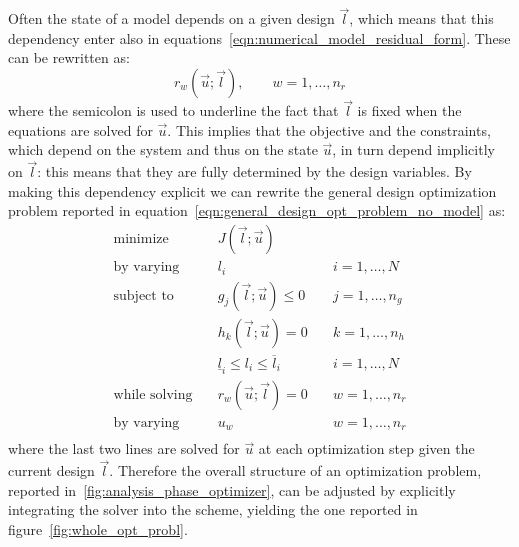 Often the state of a model depends on a given design $\vec{l}$, which means that this dependency enter also in equations~\eqref{eqn:numerical_model_residual_form}. These can be rewritten as:
\begin{equation}
	r_w(\vec{u};\vec{l}), \qquad w=1, \dots, n_r
\end{equation}
where the semicolon is used to underline the fact that $\vec{l}$ is fixed when the equations are solved for $\vec{u}$.
This implies that the objective and the constraints, which depend on the system and thus on the state $\vec{u}$, in turn depend implicitly on $\vec{l}$: this means that they are fully determined by the design variables. By making this dependency explicit we can rewrite the general design optimization problem reported in equation~\eqref{eqn:general_design_opt_problem_no_model} as:
\begin{equation}
\label{eqn:general_design_opt_problem_with_model}
\begin{aligned}
	\text{minimize}   & \quad J(\vec{l}; \vec{u})														   \\
	\text{by varying} & \quad l_i  & \quad i=1, \dots, N    \\
	\text{subject to} & \quad g_j(\vec{l}; \vec{u})	 \le 0							  & \quad j=1, \dots, n_g  \\
	& \quad h_k(\vec{l}; \vec{u}) = 0								  & \quad k=1, \dots, n_h  \\
	& \quad \underline{l}_i \le l_i \le \overline{l}_i  & \quad i=1, \dots, N \\
	\text{while solving} & \quad r_w(\vec{u}; \vec{l}) = 0 & \quad w = 1, \dots, n_r  \\
	\text{by varying} & \quad u_w & \quad w = 1, \dots, n_r  \\
\end{aligned}
\end{equation}
where the last two lines are solved for $\vec{u}$ at each optimization step given the current design $\vec{l}$.
Therefore the overall structure of an optimization problem, reported in~\ref{fig:analysis_phase_optimizer}, can be adjusted by explicitly integrating the solver into the scheme, yielding the one reported in figure~\ref{fig:whole_opt_probl}.

